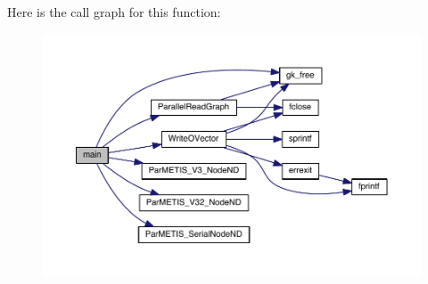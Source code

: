 Here is the call graph for this function\+:\nopagebreak
\begin{figure}[H]
\begin{center}
\leavevmode
\includegraphics[width=350pt]{a00434_a0ddf1224851353fc92bfbff6f499fa97_cgraph}
\end{center}
\end{figure}
